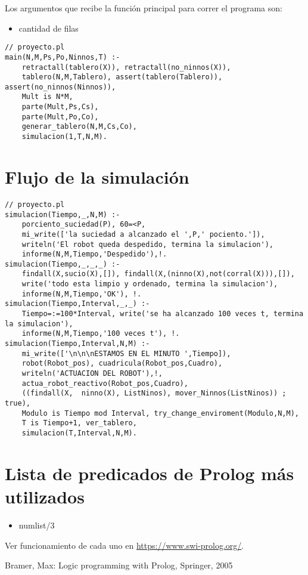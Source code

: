 \documentclass{llncs}
\begin{document}
Los argumentos que recibe la funci\'on principal para correr el programa son:
\begin{itemize}
\item[N:] cantidad de filas
\end{itemize}

\begin{lstlisting}
// proyecto.pl
main(N,M,Ps,Po,Ninnos,T) :-
    retractall(tablero(X)), retractall(no_ninnos(X)),
    tablero(N,M,Tablero), assert(tablero(Tablero)), assert(no_ninnos(Ninnos)),
    Mult is N*M,
    parte(Mult,Ps,Cs),
    parte(Mult,Po,Co),
    generar_tablero(N,M,Cs,Co),
    simulacion(1,T,N,M).
\end{lstlisting}


\section{Flujo de la simulaci\'on}

\begin{lstlisting}
// proyecto.pl
simulacion(Tiempo,_,N,M) :- 
    porciento_suciedad(P), 60=<P,
    mi_write(['la suciedad a alcanzado el ',P,' pociento.']),
    writeln('El robot queda despedido, termina la simulacion'),
    informe(N,M,Tiempo,'Despedido'),!.
simulacion(Tiempo,_,_,_) :-
    findall(X,sucio(X),[]), findall(X,(ninno(X),not(corral(X))),[]),
    write('todo esta limpio y ordenado, termina la simulacion'),
    informe(N,M,Tiempo,'OK'), !.
simulacion(Tiempo,Interval,_,_) :-
    Tiempo=:=100*Interval, write('se ha alcanzado 100 veces t, termina la simulacion'), 
    informe(N,M,Tiempo,'100 veces t'), !.
simulacion(Tiempo,Interval,N,M) :-
    mi_write(['\n\n\nESTAMOS EN EL MINUTO ',Tiempo]),
    robot(Robot_pos), cuadricula(Robot_pos,Cuadro),
    writeln('ACTUACION DEL ROBOT'),!,
    actua_robot_reactivo(Robot_pos,Cuadro),
    ((findall(X,  ninno(X), ListNinos), mover_Ninnos(ListNinos)) ; true),   
    Modulo is Tiempo mod Interval, try_change_enviroment(Modulo,N,M),
    T is Tiempo+1, ver_tablero,
    simulacion(T,Interval,N,M).
\end{lstlisting}


\section{Lista de predicados de Prolog m\'as utilizados}

\begin{itemize}
\item numlist/3
\end{itemize}

Ver funcionamiento de cada uno en \url{https://www.swi-prolog.org/}.

\begin{thebibliography}{5}  

	Bramer, Max:
	Logic programming with Prolog,
	Springer, 
	2005
\end{thebibliography}
\end{document}
